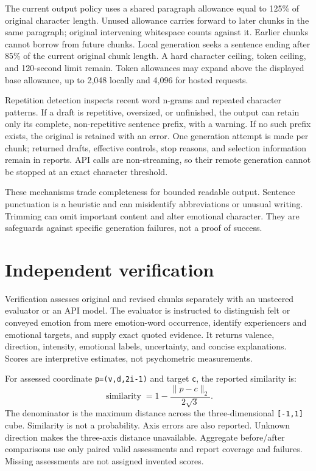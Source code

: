 \documentclass[manuscript,screen,nonacm]{acmart}
\begin{document}
The current output policy uses a shared paragraph allowance equal to
125\% of original character length. Unused allowance carries forward to
later chunks in the same paragraph; original intervening whitespace
counts against it. Earlier chunks cannot borrow from future chunks.
Local generation seeks a sentence ending after 85\% of the current
original chunk length. A hard character ceiling, token ceiling, and
120-second limit remain. Token allowances may expand above the displayed
base allowance, up to 2,048 locally and 4,096 for hosted requests.

Repetition detection inspects recent word n-grams and repeated character
patterns. If a draft is repetitive, oversized, or unfinished, the output
can retain only its complete, non-repetitive sentence prefix, with a
warning. If no such prefix exists, the original is retained with an
error. One generation attempt is made per chunk; returned drafts,
effective controls, stop reasons, and selection information remain in
reports. API calls are non-streaming, so their remote generation cannot
be stopped at an exact character threshold.

These mechanisms trade completeness for bounded readable output.
Sentence punctuation is a heuristic and can misidentify abbreviations or
unusual writing. Trimming can omit important content and alter emotional
character. They are safeguards against specific generation failures, not
a proof of success.

\section{Independent verification}\label{independent-verification}



Verification assesses original and revised chunks separately with an
unsteered evaluator or an API model. The evaluator is instructed to
distinguish felt or conveyed emotion from mere emotion-word occurrence,
identify experiencers and emotional targets, and supply exact quoted
evidence. It returns valence, direction, intensity, emotional labels,
uncertainty, and concise explanations. Scores are interpretive
estimates, not psychometric measurements.

For assessed coordinate \nolinkurl{p=(v,d,2i-1)} and target \nolinkurl{c}, the
reported similarity is:
\[\operatorname{similarity}=1-\frac{\lVert p-c\rVert_2}{2\sqrt3}.\]
The denominator is the maximum distance across the three-dimensional
\texttt{{[}-1,1{]}} cube. Similarity is not a probability. Axis errors
are also reported. Unknown direction makes the three-axis distance
unavailable. Aggregate before/after comparisons use only paired valid
assessments and report coverage and failures. Missing assessments are
not assigned invented scores.
\end{document}
